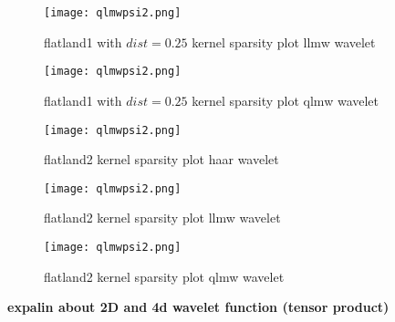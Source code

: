 \begin{figure}[tbh]
\centering{}
\captionsetup{justification=centering}
\texttt{[image: qlmwpsi2.png]}
\caption{\label{fig:replacethis7}flatland1 with $dist=0.25$ kernel sparsity plot llmw wavelet}
\end{figure}

\begin{figure}[tbh]
\centering{}
\captionsetup{justification=centering}
\texttt{[image: qlmwpsi2.png]}
\caption{\label{fig:replacethis8}flatland1 with $dist=0.25$ kernel sparsity plot qlmw wavelet}
\end{figure}


\begin{figure}[tbh]
\centering{}
\captionsetup{justification=centering}
\texttt{[image: qlmwpsi2.png]}
\caption{\label{fig:replacethis9}flatland2  kernel sparsity plot haar wavelet}
\end{figure}

\begin{figure}[tbh]
\centering{}
\captionsetup{justification=centering}
\texttt{[image: qlmwpsi2.png]}
\caption{\label{fig:replacethis10}flatland2  kernel sparsity plot  llmw wavelet}
\end{figure}

\begin{figure}[tbh]
\centering{}
\captionsetup{justification=centering}
\texttt{[image: qlmwpsi2.png]}
\caption{\label{fig:replacethis11}flatland2 kernel sparsity plot qlmw wavelet}
\end{figure}

{\bf expalin about 2D and 4d wavelet function (tensor product)}